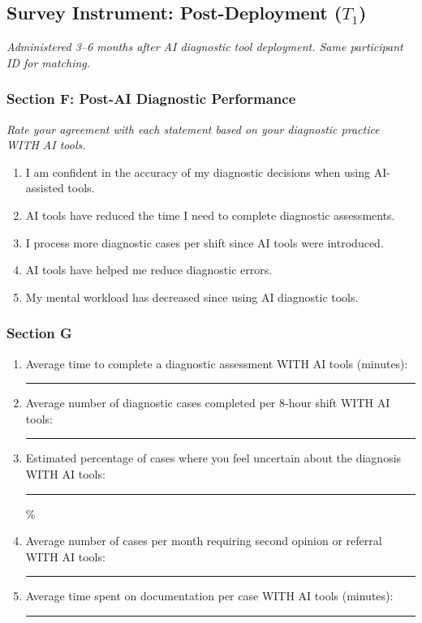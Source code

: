 \subsection{Survey Instrument: Post-Deployment ($T_1$)}

\noindent\textit{Administered 3--6 months after AI diagnostic tool deployment. Same participant ID for matching.}

\subsubsection{Section F: Post-AI Diagnostic Performance}
\label{sec:post_performance}

\noindent\textit{Rate your agreement with each statement based on your diagnostic practice WITH AI tools.}

\begin{enumerate}[label=\textbf{QP\arabic*.}]
    \item I am confident in the accuracy of my diagnostic decisions when using AI-assisted tools. \hfill {}    
    \item AI tools have reduced the time I need to complete diagnostic assessments. \hfill {}    
    \item I process more diagnostic cases per shift since AI tools were introduced. \hfill {}    
    \item AI tools have helped me reduce diagnostic errors. \hfill {}    
    \item My mental workload has decreased since using AI diagnostic tools. \hfill {}    
\end{enumerate}

\subsubsection{Section G}
\label{sec:post_time}

\begin{enumerate}[label=\textbf{QT\arabic*.}]
    \item Average time to complete a diagnostic assessment WITH AI tools (minutes): \rule{2cm}{0.4pt}
    \item Average number of diagnostic cases completed per 8-hour shift WITH AI tools: \rule{2cm}{0.4pt}
    \item Estimated percentage of cases where you feel uncertain about the diagnosis WITH AI tools: \rule{2cm}{0.4pt}\%
    \item Average number of cases per month requiring second opinion or referral WITH AI tools: \rule{2cm}{0.4pt}
    \item Average time spent on documentation per case WITH AI tools (minutes): \rule{2cm}{0.4pt}
\end{enumerate}

